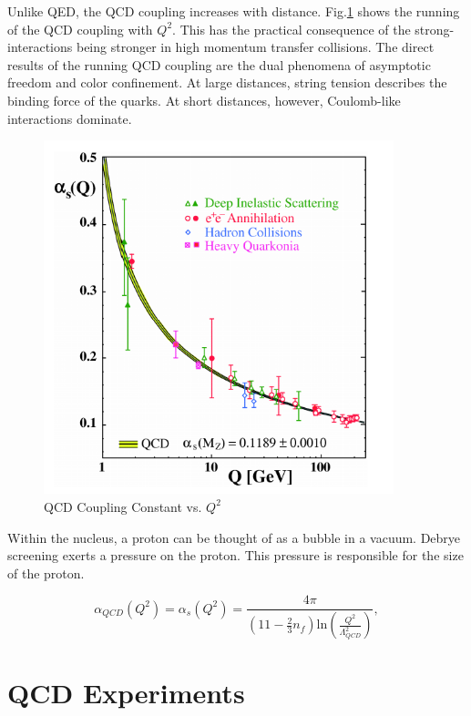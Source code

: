 Unlike QED, the QCD coupling increases with distance. Fig.\ref{fig:runningQCDCoupling} shows the running of the QCD coupling with $Q^2$. This has the practical consequence of the strong-interactions being stronger in high momentum transfer collisions. The direct results of the running QCD coupling are the dual phenomena of asymptotic freedom and color confinement. At large distances, string tension describes the binding force of the quarks. At short distances, however, Coulomb-like interactions dominate.

\begin{figure}[h!]
\begin{centering}
\includegraphics[width=4in]{Chapter1/importfigs/qcd_coupling_bethke.png}
\par\end{centering}
\caption{QCD Coupling Constant vs. $Q^2$ \label{fig:runningQCDCoupling}}
\end{figure}

Within the nucleus, a proton can be thought of as a bubble in a vacuum. Debrye screening exerts a pressure on the proton. This pressure is responsible for the size of the proton. 

\begin{equation}
\alpha_{QCD}(Q^2) = \alpha_{s}(Q^2) = \frac{4 \pi }{(11 - \frac{2}{3}n_f)\mathrm{ln}(\frac{Q^2}{\Lambda^2_{QCD}}) } ,
\end{equation}

\section{QCD Experiments}

